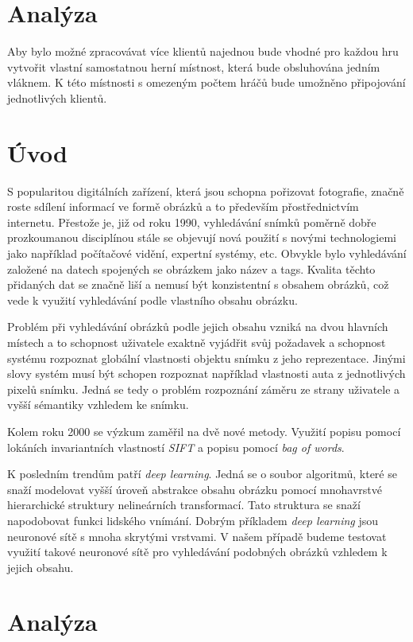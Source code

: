 \documentclass[12pt]{article}
\begin{document}
\section{Analýza}
Aby bylo možné zpracovávat více klientů najednou bude vhodné pro každou hru vytvořit vlastní samostatnou herní místnost, která bude obsluhována jedním vláknem. K této místnosti s omezeným počtem hráčů bude umožněno připojování jednotlivých klientů. 

\section{Úvod}
S popularitou digitálních zařízení, která jsou schopna pořizovat fotografie, značně roste sdílení informací ve formě obrázků a to především přostřednictvím internetu. Přestože je, již od roku 1990\cite{Relevance_feedback}, vyhledávání snímků poměrně dobře prozkoumanou disciplínou stále se objevují nová použití s novými technologiemi jako například počítačové vidění, expertní systémy, etc. Obvykle bylo vyhledávání založené na datech spojených se obrázkem jako název a tags. Kvalita těchto přidaných dat se značně liší a nemusí být konzistentní s obsahem obrázků, což vede k využití vyhledávání podle vlastního obsahu obrázku. 

Problém při vyhledávání obrázků podle jejich obsahu vzniká na dvou hlavních místech a to schopnost uživatele exaktně vyjádřit svůj požadavek a schopnost systému rozpoznat globální vlastnosti objektu snímku z jeho reprezentace\cite{Recent_advanceCBIR, DeepLearning_comprehensive}. Jinými slovy systém musí být schopen rozpoznat například vlastnosti auta z jednotlivých pixelů snímku. Jedná se tedy o problém rozpoznání záměru ze strany uživatele a vyšší sémantiky vzhledem ke snímku.

Kolem roku 2000 se výzkum zaměřil na dvě nové metody. Využití popisu pomocí lokáních invariantních vlastností \textit{SIFT} a popisu pomocí \textit{bag of words}.

K posledním trendům patří \textit{deep learning}. Jedná se o soubor algoritmů, které se snaží modelovat vyšší úroveň abstrakce obsahu obrázku pomocí mnohavrstvé hierarchické struktury nelineárních transformací. Tato struktura se snaží napodobovat funkci lidského vnímání. Dobrým příkladem \textit{deep learning} jsou neuronové sítě s mnoha skrytými vrstvami. V našem případě budeme testovat využití takové neuronové sítě pro vyhledávání podobných obrázků vzhledem k jejich obsahu.

\section{Analýza}\label{Analysis}
\end{document}
